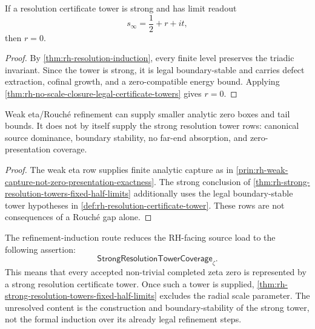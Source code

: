 \begin{theorem}
\label{thm:rh-strong-resolution-towers-fixed-half-limits}
If a resolution certificate tower is strong and has limit readout
$$
s_{\infty}=\frac12+r+it,
$$
then $r=0$.
\end{theorem}

\begin{proof}
By \autoref{thm:rh-resolution-induction}, every finite level preserves
the triadic invariant. Since the tower is strong, it is legal
boundary-stable and carries defect extraction, cofinal growth, and a
zero-compatible energy bound. Applying
\autoref{thm:rh-no-scale-closure-legal-certificate-towers} gives $r=0$.
\end{proof}

\begin{corollary}
\label{cor:rh-resolution-induction-weak-strong-separation}
Weak eta/Rouch\'e refinement can supply smaller analytic zero boxes and
tail bounds. It does not by itself supply the strong resolution tower
rows: canonical source dominance, boundary stability, no far-end
absorption, and zero-presentation coverage.
\end{corollary}

\begin{proof}
The weak eta row supplies finite analytic capture as in
\autoref{prin:rh-weak-capture-not-zero-presentation-exactness}. The
strong conclusion of
\autoref{thm:rh-strong-resolution-towers-fixed-half-limits} additionally
uses the legal boundary-stable tower hypotheses in
\autoref{def:rh-resolution-certificate-tower}. These rows are not
consequences of a Rouch\'e gap alone.
\end{proof}

\begin{principle}
\label{prin:rh-resolution-route-proof-load}
The refinement-induction route reduces the RH-facing source load to the
following assertion:
$$
\mathsf{StrongResolutionTowerCoverage}_{\zeta}.
$$
This means that every accepted non-trivial completed zeta zero is
represented by a strong resolution certificate tower. Once such a tower
is supplied, \autoref{thm:rh-strong-resolution-towers-fixed-half-limits}
excludes the radial scale parameter. The unresolved content is the
construction and boundary-stability of the strong tower, not the formal
induction over its already legal refinement steps.
\end{principle}

